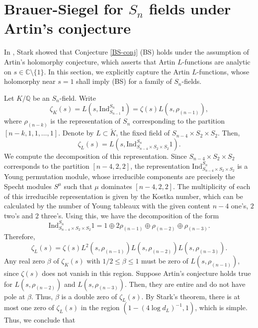 \documentclass[12pt]{amsart}
\theoremstyle{definition}
\newcommand{\Q}{\mathbb{Q}}
\newcommand{\C}{\mathbb{C}}
\newcommand{\Ind}{\text{Ind}}
\begin{document}
\bigskip

\section{Brauer-Siegel for $S_n$ fields under Artin's conjecture}
\bigskip

% 



In \cite[Theorem 4]{Stk}, Stark showed that Conjecture \ref{BS-conj} (BS) holds under the assumption of Artin's holomorphy conjecture, which asserts that Artin $L$-functions are analytic on $s\in\C\setminus\{1\}$.
In this section, we explicitly capture the Artin $L$-functions, whose holomorphy near $s=1$ shall imply (BS) for a family of $S_n$-fields.
\medskip

Let $K/\Q$ be an $S_n$-field.  Write
    $$
        \zeta_K(s) = L(s, \Ind^{S_n}_{S_{n-1}} 1) = \zeta(s) L(s,\rho_{(n-1)}),  
    $$
where $\rho_{(n-k)}$ is the representation of $S_n$ corresponding to the partition $[n-k,1,1,\ldots, 1]$.  Denote by $L\subset \widetilde{K}$, the fixed field of $S_{n-4}\times S_2 \times S_2$. Then,
    \begin{equation*}
        \zeta_L(s)   = L(s,\Ind^{S_n}_{S_{n-4} \times S_2 \times S_2} 1).
    \end{equation*}
 We compute the decomposition of this representation. Since $S_{n-4}\times S_2 \times S_2$ corresponds to the partition $[n-4,2,2]$, the representation $\Ind^{S_n}_{S_{n-4} \times S_2 \times S_2}$ is a Young permutation module, whose irreducible components are precisely the Specht modules $S^{\mu}$ such that $\mu$ dominates $[n-4,2,2]$. The multiplicity of each of this irreducible representation is given by the Kostka number, which can be calculated by the number of Young tableaux with the given content $n-4$ one's, $2$ two's and $2$ three's. Using this, we have the decomposition  of the form
    \begin{equation*}
        \Ind^{S_n}_{S_{n-4}\times S_2 \times S_2} 1 = 1 \oplus 2 \rho_{(n-1)} \oplus \rho_{(n-2)} \oplus \rho_{(n-3)}.
    \end{equation*}
    Therefore,
    \begin{equation*}
        \zeta_L(s) = \zeta(s) L^2(s,\rho_{(n-1)}) L(s,\rho_{(n-2)}) L(s, \rho_{(n-3)}).
    \end{equation*}
Any real zero $\beta$ of $\zeta_K(s)$ with $1/2\leq \beta \leq 1$ must be  zero of $L(s,\rho_{(n-1)})$, since $\zeta(s)$ does not vanish in this region. Suppose Artin's conjecture holds true for $L(s,\rho_{(n-2)})$ and $L(s,\rho_{(n-3)})$. Then, they are entire and do not have pole at $\beta$. Thus, $\beta$ is a double zero of $\zeta_L(s)$. By Stark's theorem, there is at most one zero of $\zeta_L(s)$ in the region $(1- (4\log d_L)^{-1}, 1)$, which is simple. Thus, we conclude that
\end{document}

